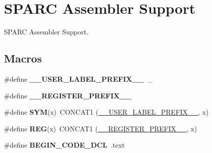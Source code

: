 \hypertarget{group__RTEMSScoreCPUSPARCASM}{}\section{S\+P\+A\+RC Assembler Support}
\label{group__RTEMSScoreCPUSPARCASM}


S\+P\+A\+RC Assembler Support.  


\subsection*{Macros}
\begin{DoxyCompactItemize}
\item 
\mbox{\label{group__RTEMSScoreCPUSPARCASM_gaff6bf0ff0fa3b5cbd23a8ae1131c87a9}} 
\#define {\bfseries \+\_\+\+\_\+\+U\+S\+E\+R\+\_\+\+L\+A\+B\+E\+L\+\_\+\+P\+R\+E\+F\+I\+X\+\_\+\+\_\+}~\+\_\+
\item 
\mbox{\label{group__RTEMSScoreCPUSPARCASM_ga08d4062230ffc8494f4be4f6447497e4}} 
\#define {\bfseries \+\_\+\+\_\+\+R\+E\+G\+I\+S\+T\+E\+R\+\_\+\+P\+R\+E\+F\+I\+X\+\_\+\+\_\+}
\item 
\mbox{\label{group__RTEMSScoreCPUSPARCASM_gafe05d428a5f345f51fb591debb815325}} 
\#define {\bfseries S\+YM}(x)~C\+O\+N\+C\+A\+T1 (\mbox{\hyperlink{group__RTEMSScoreCPUx86-64ASM_gaff6bf0ff0fa3b5cbd23a8ae1131c87a9}{\+\_\+\+\_\+\+U\+S\+E\+R\+\_\+\+L\+A\+B\+E\+L\+\_\+\+P\+R\+E\+F\+I\+X\+\_\+\+\_\+}}, x)
\item 
\mbox{\label{group__RTEMSScoreCPUSPARCASM_gacee196421e9a06f7700bb3064b13b37a}} 
\#define {\bfseries R\+EG}(x)~C\+O\+N\+C\+A\+T1 (\mbox{\hyperlink{group__RTEMSScoreCPUV850ASM_ga08d4062230ffc8494f4be4f6447497e4}{\+\_\+\+\_\+\+R\+E\+G\+I\+S\+T\+E\+R\+\_\+\+P\+R\+E\+F\+I\+X\+\_\+\+\_\+}}, x)
\item 
\mbox{\label{group__RTEMSScoreCPUSPARCASM_ga63dd305e6cb437ad2dc29a4184f96fbc}} 
\#define {\bfseries B\+E\+G\+I\+N\+\_\+\+C\+O\+D\+E\+\_\+\+D\+CL}~.text
\item 
\mbox{\label{group__RTEMSScoreCPUSPARCASM_gad7bee6a7cae4ed99b9f83f54afaecec8}} 

\end{DoxyCompactItemize}
